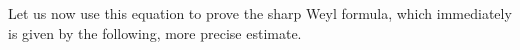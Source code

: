 \begin{comment}
    We have
    \[ \frac{\partial^N K_t(x,y)}{\partial t^N} = (2 \pi i)^N \int (\phi_1(x,y,\xi) - \phi_0(x,y,\xi))^N a(x,y,\xi) e^{2 \pi i \phi_t(x,y,\xi)}\; d\xi. \]
    Now $(\phi_1 - \phi_0)^N \cdot a$ is a symbol of order $r + N$. But on the other hand, using the fact that $(\phi_1 - \phi_0)^N \lesssim |x - y|^{2N} |\xi|^N$, and thus vanishes to order $2N$ on the diagonal, then combined with the fact that $|\nabla_\xi \phi(x,y,\xi)| \gtrsim |x - y|$, we actually see via an integration by parts $2N$ times in $\xi$ that we can rewrite the integral in terms of a symbol of order $r - N$ and the same phase $\phi_t$. Applying Taylor's theorem, we write
    \[ K(x,y) = K_1(x,y) = \sum_{k = 0}^{N-1} \frac{1}{k!} \left. \frac{\partial^k K_t(x,y)}{\partial t^k} \right|_{t = 1} + \frac{1}{N!} \int_0^1 t^{N-1} \frac{d^NK_t(x,y)}{dt^N}\; dt. \]
    This integral gives an arbitrarily smooth kernel as $N \to \infty$. Thus if we let $T$ be a pseudodifferential operator of order $r$ such that
    \[ T \sim \sum_{k = 0}^\infty \frac{1}{k!} \left. \frac{\partial^k K_t(x,y)}{\partial t^k} \right|_{t = 1}, \]
    then $T - S$ is a smoothing operator. Now if $\tilde{T}$ is the pseudodifferential operator corresponding to the symbol $a(x,x,\xi)$, then $T - \tilde{T}$, and thus $S - \tilde{T}$, is a pseudodifferential operator of order $r-1$. The converse is similar, working in the opposite direction, i.e. from $t = 1$ to $t = 0$, and is left as an exercise.
\end{proof}
\end{comment}

%
%

Let us now use this equation to prove the sharp Weyl formula, which immediately is given by the following, more precise estimate.

